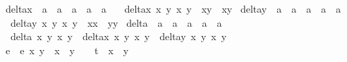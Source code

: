 \begin{isabellebody}
\isanewline
\isanewline
\isanewline
\isanewline
{}\isamarkupfalse%
\ delta{\isacharunderscore}x\ {\isacharcolon}{\isacharcolon}\ {\isachardoublequoteopen}{\isacharprime}a\ {\isasymRightarrow}\ {\isacharprime}a\ {\isasymRightarrow}\ {\isacharprime}a\ {\isasymRightarrow}\ {\isacharprime}a\ {\isasymRightarrow}\ {\isacharprime}a{\isachardoublequoteclose}\ \isanewline
\ \ {\isachardoublequoteopen}delta{\isacharunderscore}x\ x{}\ y{}\ x{}\ y{}\ {\isacharequal}\ x{}{\isacharasterisk}y{}\ {\isacharminus}\ x{}{\isacharasterisk}y{}{\isachardoublequoteclose}\isanewline
{}\isamarkupfalse%
\ delta{\isacharunderscore}y\ {\isacharcolon}{\isacharcolon}\ {\isachardoublequoteopen}{\isacharprime}a\ {\isasymRightarrow}\ {\isacharprime}a\ {\isasymRightarrow}\ {\isacharprime}a\ {\isasymRightarrow}\ {\isacharprime}a\ {\isasymRightarrow}\ {\isacharprime}a{\isachardoublequoteclose}\ \isanewline
\ \ {\isachardoublequoteopen}delta{\isacharunderscore}y\ x{}\ y{}\ x{}\ y{}\ {\isacharequal}\ x{}{\isacharasterisk}x{}\ {\isacharplus}\ y{}{\isacharasterisk}y{}{\isachardoublequoteclose}\isanewline
{}\isamarkupfalse%
\ delta{\isacharprime}\ {\isacharcolon}{\isacharcolon}\ {\isachardoublequoteopen}{\isacharprime}a\ {\isasymRightarrow}\ {\isacharprime}a\ {\isasymRightarrow}\ {\isacharprime}a\ {\isasymRightarrow}\ {\isacharprime}a\ {\isasymRightarrow}\ {\isacharprime}a{\isachardoublequoteclose}\ \isanewline
\ \ {\isachardoublequoteopen}delta{\isacharprime}\ x{}\ y{}\ x{}\ y{}\ {\isacharequal}\ delta{\isacharunderscore}x\ x{}\ y{}\ x{}\ y{}\ {\isacharasterisk}\ delta{\isacharunderscore}y\ x{}\ y{}\ x{}\ y{}{\isachardoublequoteclose}\isanewline
\isanewline
{}\isamarkupfalse%
\ e{\isacharprime}\ \ {\isachardoublequoteopen}e{\isacharprime}\ x\ y\ {\isacharequal}\ x{\isacharcircum}{}\ {\isacharplus}\ y{\isacharcircum}{}\ {\isacharminus}\ {}\ {\isacharminus}\ t{\isacharcircum}{}\ {\isacharasterisk}\ x{\isacharcircum}{}\ {\isacharasterisk}\ y{\isacharcircum}{}{\isachardoublequoteclose}\isanewline
\isanewline
{}\isamarkupfalse%

\end{isabellebody}
